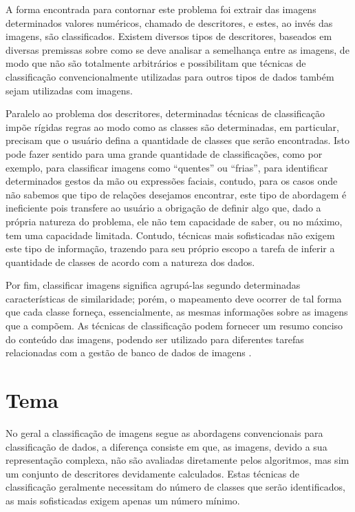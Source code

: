 A forma encontrada para contornar este problema foi extrair das imagens
determinados valores numéricos, chamado de descritores, e estes, ao invés das
imagens, são classificados. Existem diversos tipos de descritores, baseados em
diversas premissas sobre como se deve analisar a semelhança entre as imagens,
de modo que não são totalmente arbitrários e possibilitam que técnicas de
classificação convencionalmente utilizadas para outros tipos de dados também
sejam utilizadas com imagens.

Paralelo ao problema dos descritores, determinadas técnicas de classificação
impõe rígidas regras ao modo como as classes são determinadas, em particular,
precisam que o usuário defina a quantidade de classes que serão encontradas.
Isto pode fazer sentido para uma grande quantidade de classificações, como por
exemplo, para classificar imagens como “quentes” ou “frias”, para identificar
determinados gestos da mão ou expressões faciais, contudo, para os casos onde
não sabemos que tipo de relações desejamos encontrar, este tipo de abordagem é
ineficiente pois transfere ao usuário a obrigação de definir algo que, dado a
própria natureza do problema, ele não tem capacidade de saber, ou no máximo,
tem uma capacidade limitada. Contudo, técnicas mais sofisticadas não exigem este
tipo de informação, trazendo para seu próprio escopo a tarefa de inferir a
quantidade de classes de acordo com a natureza dos dados.

Por fim, classificar imagens significa agrupá-las segundo determinadas
características de similaridade; porém, o mapeamento deve ocorrer de tal forma
que cada classe forneça, essencialmente, as mesmas informações sobre as imagens
que a compõem. As técnicas de classificação podem fornecer um resumo conciso do
conteúdo das imagens, podendo ser utilizado para diferentes tarefas relacionadas
com a gestão de banco de dados de imagens \cite{UnsupervisedImageSet}.

\section{Tema}

No geral a classificação de imagens segue as abordagens convencionais para
classificação de dados,  a diferença consiste em que, as imagens, devido a sua
representação complexa, não são avaliadas diretamente pelos algoritmos, mas sim
um conjunto de descritores devidamente calculados. Estas técnicas de
classificação geralmente necessitam do número de classes que serão
identificados, as mais sofisticadas exigem apenas um número mínimo.

